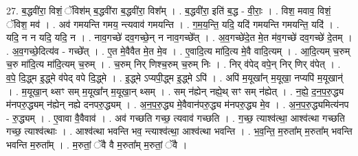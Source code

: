 \documentclass[17pt]{extarticle}
\begin{document}
27. ब॒द्धवी॑रा॒ विशं॒ ॅविश॑म् ब॒द्धवी॑रा ब॒द्धवी॑रा॒ विश᳚म् । . ब॒द्धवी॑रा॒ इति॑ ब॒द्ध - वी॒राः॒ । . विश॒ मवाव॒ विशं॒ ॅविश॒ मव॑ । . अव॑ गमयन्ति गमय॒ न्त्यवाव॑ गमयन्ति । . ग॒म॒य॒न्ति॒ यदि॒ यदि॑ गमयन्ति गमयन्ति॒ यदि॑ । . यदि॒ न न यदि॒ यदि॒ न । . नाव॒गच्छे॑ दव॒गच्छे॒न् न नाव॒गच्छे᳚त् । . अ॒व॒गच्छे॑दे॒त मे॒त म॑व॒गच्छे॑ दव॒गच्छे॑ दे॒तम् । . अ॒व॒गच्छे॒दित्य॑व - गच्छे᳚त् । . ए॒त मे॒वैवैत मे॒त मे॒व । . ए॒वादि॒त्य मा॑दि॒त्य मे॒वै वादि॒त्यम् । . आ॒दि॒त्यम् च॒रुम् च॒रु मा॑दि॒त्य मा॑दि॒त्यम् च॒रुम् । . च॒रुम् निर् णिश्च॒रुम् च॒रुम् निः । . निर् व॑पेद् वपे॒न् निर् णिर् व॑पेत् । . व॒पे॒ दि॒द्ध्म इ॒द्ध्मे व॑पेद् वपे दि॒द्ध्मे । . इ॒द्ध्मे ऽप्यपी॒द्ध्म इ॒द्ध्मे ऽपि॑ । . अपि॑ म॒यूखा᳚न् म॒यूखा॒ नप्यपि॑ म॒यूखान्॑ । . म॒यूखा॒न् थ्सꣳ सम् म॒यूखा᳚न् म॒यूखा॒न् थ्सम् । . सम् न॑ह्येन् नह्ये॒थ् सꣳ सम् न॑ह्येत् । . न॒ह्ये॒ द॒न॒प॒रु॒द्ध्य म॑नपरु॒द्ध्यम् न॑ह्येन् नह्ये दनपरु॒द्ध्यम् । . अ॒न॒प॒रु॒द्ध्य मे॒वैवान॑परु॒द्ध्य म॑नपरु॒द्ध्य मे॒व । . अ॒न॒प॒रु॒द्ध्यमित्य॑नप - रु॒द्ध्यम् । . ए॒वावा वै॒वैवाव॑ । . अव॑ गच्छति गच्छ॒ त्यवाव॑ गच्छति । . ग॒च्छ॒ त्याश्व॑त्था॒ आश्व॑त्था गच्छति गच्छ॒ त्याश्व॑त्थाः । . आश्व॑त्था भवन्ति भव॒ न्त्याश्व॑त्था॒ आश्व॑त्था भवन्ति । . भ॒व॒न्ति॒ म॒रुता᳚म् म॒रुता᳚म् भवन्ति भवन्ति म॒रुता᳚म् । . म॒रुतां॒ ॅवै वै म॒रुता᳚म् म॒रुतां॒ ॅवै । \newline
\end{document}

